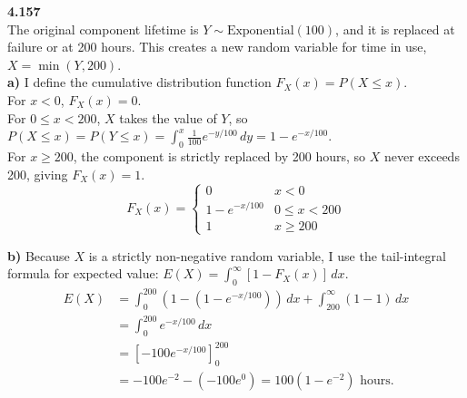 \documentclass[12pt]{article}
\begin{document}
\vspace{0.5cm}

\noindent \textbf{4.157} \\
The original component lifetime is $Y \sim \text{Exponential}(100)$, and it is replaced at failure or at 200 hours. This creates a new random variable for time in use, $X = \min(Y, 200)$. \\
\textbf{a)} I define the cumulative distribution function $F_X(x) = P(X \le x)$. \\
For $x < 0$, $F_X(x) = 0$. \\
For $0 \le x < 200$, $X$ takes the value of $Y$, so $P(X \le x) = P(Y \le x) = \int_0^x \frac{1}{100}e^{-y/100} \, dy = 1 - e^{-x/100}$. \\
For $x \ge 200$, the component is strictly replaced by 200 hours, so $X$ never exceeds 200, giving $F_X(x) = 1$.
\[ F_X(x) = \begin{cases} 0 & x < 0 \\ 1 - e^{-x/100} & 0 \le x < 200 \\ 1 & x \ge 200 \end{cases} \]

\vspace{0.2cm}
\noindent \textbf{b)} Because $X$ is a strictly non-negative random variable, I use the tail-integral formula for expected value: $E(X) = \int_0^\infty [1 - F_X(x)] \, dx$.
\begin{align*}
E(X) &= \int_0^{200} (1 - (1 - e^{-x/100})) \, dx + \int_{200}^\infty (1 - 1) \, dx \\
&= \int_0^{200} e^{-x/100} \, dx \\
&= \left[ -100 e^{-x/100} \right]_0^{200} \\
&= -100e^{-2} - (-100e^0) = 100(1 - e^{-2}) \text{ hours}.
\end{align*}
\end{document}
